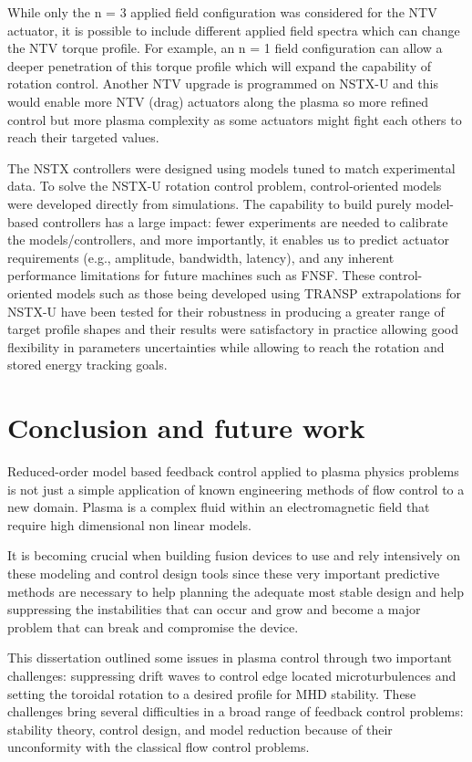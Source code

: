 \documentclass[12pt,lot, lof]{puthesis}
\begin{document}
While only the n = 3 applied field configuration was considered for the NTV actuator, it is possible to include different applied field spectra which can change the NTV torque profile. For example, an n = 1 field configuration can allow a deeper penetration of this torque profile which will expand the capability of rotation control. Another NTV upgrade is programmed on NSTX-U and this would enable more NTV (drag) actuators along the plasma so more refined control but more plasma complexity as some actuators might fight each others to reach their targeted values.

The NSTX controllers were designed using models tuned to match experimental data. To solve the NSTX-U rotation control problem, control-oriented models were developed directly from simulations. The capability to build purely model-based controllers has a large impact: fewer experiments are needed to calibrate the models/controllers, and more importantly, it enables us to predict actuator requirements (e.g., amplitude, bandwidth, latency), and any inherent performance limitations for future machines such as FNSF. These control-oriented models such as those being developed using TRANSP extrapolations for NSTX-U have been tested for their robustness in producing a greater range of target profile shapes and their results were satisfactory in practice allowing good flexibility in parameters uncertainties while allowing to reach the rotation and stored energy tracking goals.


\chapter{Conclusion and future work}

Reduced-order model based feedback control applied to plasma physics problems is not just a simple application of known engineering methods of flow control to a new domain. Plasma is a complex fluid within an electromagnetic field that require high dimensional  non linear models.
 
It is becoming crucial when building fusion devices to use and rely intensively on these modeling and control design tools since these very important predictive methods are necessary to help planning the adequate most stable design and help suppressing the instabilities that can occur and grow and become a major problem that can break and compromise the device. 

This dissertation outlined some issues in plasma control through two important challenges: suppressing drift waves to control edge located microturbulences and setting the toroidal rotation to a desired profile for MHD stability. These challenges bring several difficulties in a broad range of feedback control problems: stability theory, control design, and model reduction because of their unconformity with the classical flow control problems.
\end{document}

